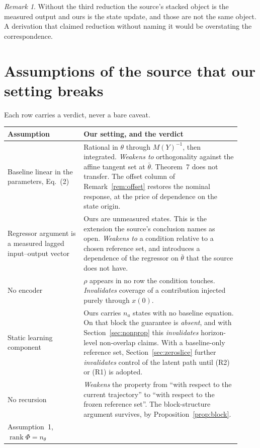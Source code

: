 \documentclass[11pt,a4paper]{article}
\newcommand{\rank}{\operatorname{rank}}
\theoremstyle{remark}
\newtheorem{remark}[proposition]{Remark}
\begin{document}
\begin{remark}
Without the third reduction the source's stacked object is the measured output and ours is the
state update, and those are not the same object. A derivation that claimed reduction without
naming it would be overstating the correspondence.
\end{remark}

\section{Assumptions of the source that our setting breaks}\label{sec:assumptions}

Each row carries a verdict, never a bare caveat.

\begin{longtable}{@{}p{0.30\linewidth}p{0.62\linewidth}@{}}
\toprule
\textbf{Assumption} & \textbf{Our setting, and the verdict}\\
\midrule
\endhead
Baseline linear in the parameters, Eq.~(2)
& Rational in $\theta$ through $M(Y)^{-1}$, then integrated. \emph{Weakens to} orthogonality
against the affine tangent set at $\bar\theta$. Theorem~7 does not transfer. The offset column of
Remark~\ref{rem:offset} restores the nominal response, at the price of dependence on the state
origin.\\
Regressor argument is a measured lagged input--output vector
& Ours are unmeasured states. This is the extension the source's conclusion names as open.
\emph{Weakens to} a condition relative to a chosen reference set, and introduces a dependence of
the regressor on $\bar\theta$ that the source does not have.\\
No encoder
& $\rho$ appears in no row the condition touches. \emph{Invalidates} coverage of a contribution
injected purely through $x(0)$.\\
Static learning component
& Ours carries $n_a$ states with no baseline equation. On that block the guarantee is
\emph{absent}, and with Section~\ref{sec:nonprop} this \emph{invalidates} horizon-level
non-overlap claims. With a baseline-only reference set, Section~\ref{sec:zeroslice} further
\emph{invalidates} control of the latent path until (R2) or (R1) is adopted.\\
No recursion
& \emph{Weakens} the property from ``with respect to the current trajectory'' to ``with respect to
the frozen reference set''. The block-structure argument survives, by
Proposition~\ref{prop:block}.\\
Assumption~1, $\rank\Phi=n_\theta$

\end{longtable}
\end{document}

